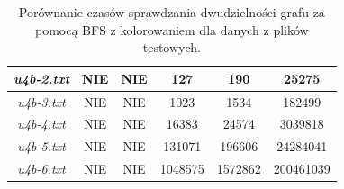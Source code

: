 \documentclass{article}
\begin{document}
\begin{table}[H]
\begin{adjustbox}{center}
\begin{tabular}{|c|c|c|c|c|c|}
    \hline
    \textit{u4b-2.txt} & NIE & NIE & 127 & 190 & 25275\\
    \hline
    \textit{u4b-3.txt} & NIE & NIE & 1023 & 1534 & 182499\\
    \hline
    \textit{u4b-4.txt} & NIE & NIE & 16383 & 24574 & 3039818\\
    \hline
    \textit{u4b-5.txt} & NIE & NIE & 131071 & 196606 & 24284041\\
    \hline
    \textit{u4b-6.txt} & NIE & NIE & 1048575 & 1572862 & 200461039\\
    \hline
\end{tabular}
\end{adjustbox}
\caption{Porównanie czasów sprawdzania dwudzielności grafu za pomocą BFS z kolorowaniem dla danych z plików testowych.}
\end{table}
\end{document}
